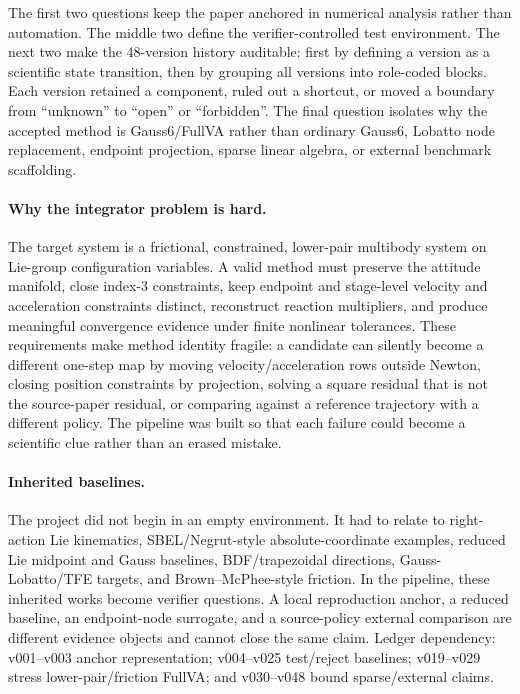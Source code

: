 \documentclass[10pt]{article}
\newcommand{\method}{Gauss6/\allowbreak FullVA}
\newcommand{\tfe}{TFE}
\begin{document}
The first two questions keep the paper anchored in numerical analysis rather
than automation. The middle two define the verifier-controlled test
environment. The next two make the 48-version history auditable: first by
defining a version as a scientific state transition, then by grouping all
versions into role-coded blocks. Each version retained a component, ruled out a
shortcut, or moved a boundary from ``unknown'' to ``open'' or ``forbidden''.
The final question isolates why the accepted method is \method{} rather than
ordinary Gauss6, Lobatto node replacement, endpoint projection, sparse linear
algebra, or external benchmark scaffolding.

\paragraph{Why the integrator problem is hard.}
The target system is a frictional, constrained, lower-pair multibody system on
Lie-group configuration variables. A valid method must preserve the attitude
manifold, close index-3 constraints, keep endpoint and stage-level velocity
and acceleration constraints distinct, reconstruct reaction multipliers, and
produce meaningful convergence evidence under finite nonlinear tolerances.
These requirements make method identity fragile: a candidate can silently
become a different one-step map by moving velocity/acceleration rows outside
Newton, closing position constraints by projection, solving a square residual
that is not the source-paper residual, or comparing against a reference
trajectory with a different policy. The pipeline was built so that each failure
could become a scientific clue rather than an erased mistake.

\paragraph{Inherited baselines.}
The project did not begin in an empty environment. It had to relate to
right-action Lie kinematics, SBEL/Negrut-style absolute-coordinate examples,
reduced Lie midpoint and Gauss baselines, BDF/trapezoidal directions,
Gauss-Lobatto/\tfe{} targets, and Brown--McPhee-style friction. In the
pipeline, these inherited works become verifier questions. A local reproduction
anchor, a reduced baseline, an endpoint-node surrogate, and a source-policy
external comparison are different evidence objects and cannot close the same
claim. Ledger dependency: v001--v003 anchor representation; v004--v025
test/reject baselines; v019--v029 stress lower-pair/friction FullVA; and
v030--v048 bound sparse/external claims.
\end{document}
